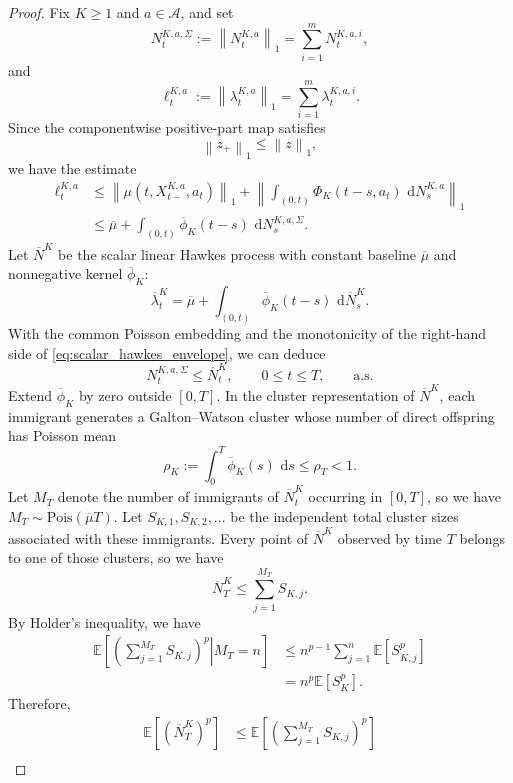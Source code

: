 \documentclass[11pt]{article}
\theoremstyle{remarkitalic}
\theoremstyle{remarkitalic}
\newcommand{\E}{\mathbb E}
\newcommand{\dd}{\,\mathrm d}
\newcommand{\1}{\mathbf 1}
\newcommand{\norm}[1]{\left\lVert #1 \right\rVert}
\begin{document}
\begin{proof}
Fix $K\geq1$ and $a\in\mathcal A$, and set
\[
    N_t^{K,a,\Sigma}
    :=
    \norm{N_t^{K,a}}_1
    =
    \sum_{i=1}^m N_t^{K,a,i},
\]
and
\[
    \ell_t^{K,a}
    :=
    \norm{\lambda_t^{K,a}}_1
    =
    \sum_{i=1}^m\lambda_t^{K,a,i}.
\] Since the componentwise positive-part map satisfies
\[
    \norm{z_+}_1\leq\norm{z}_1,
\]
we have the estimate
\begin{align}
\ell_t^{K,a}
&\leq
\norm{\mu(t,X_{t-}^{K,a},a_t)}_1
+
\left\|
    \int_{(0,t)}
    \Phi_K(t-s,a_t)\,\dd N_s^{K,a}
\right\|_1
\nonumber\\
&\leq
\overline\mu
+
\int_{(0,t)}
\overline\phi_K(t-s)\,
\dd N_s^{K,a,\Sigma}.
\label{eq:scalar_hawkes_envelope}
\end{align} Let $\overline N^K$ be the scalar linear Hawkes process with
constant baseline $\overline\mu$ and nonnegative kernel
$\overline\phi_K$:
\[
    \overline\lambda_t^K
    =
    \overline\mu
    +
    \int_{(0,t)}
    \overline\phi_K(t-s)\,\dd\overline N_s^K.
\]
With the common Poisson embedding and the monotonicity of the
right-hand side of \eqref{eq:scalar_hawkes_envelope}, we can deduce
\[
    N_t^{K,a,\Sigma}
    \leq
    \overline N_t^K,
    \qquad 0\leq t\leq T, \qquad\mbox{a.s.}
\] Extend $\overline\phi_K$ by zero outside $[0,T]$. In the cluster
representation of $\overline N^K$, each immigrant generates a Galton--Watson cluster whose number of direct offspring has Poisson mean \[
    \rho_K := \int_0^T\overline\phi_K(s)\,\dd s
    \leq\rho_T<1.
\] Let $M_T$ denote the number of immigrants of $ \overline N_t^K$ occurring in $[0,T]$, so we have $M_T\sim \mbox{Pois}(\overline{\mu}T)$. Let $S_{K,1}, S_{K,2},...$ be the independent total cluster sizes associated with these immigrants. Every point of $\overline N^K$ observed by time $T$ belongs to one of those clusters, so we have $$\overline{N}_T^K\le \sum_{j=1}^{M_T}S_{K,j}.$$ By Holder's inequality, we have \begin{equation*}
    \begin{split}
        \E\left[\left(\left.\sum_{j=1}^{M_T}S_{K,j}\right)^p\right|M_T= n\right]&\leq n^{p-1}\sum_{j=1}^n\E[S_{K,j}^p]\\
        &=n^p\E[S_{K}^p].
    \end{split}
\end{equation*} Therefore,\begin{equation*}
    \begin{split}
        \E\left[\left(\overline{N}_T^K\right)^p\right]&\le \E\left[\left(\sum_{j=1}^{M_T}S_{K,j}\right)^p\right]\\

\end{split}
\end{equation*}
\end{proof}
\end{document}
